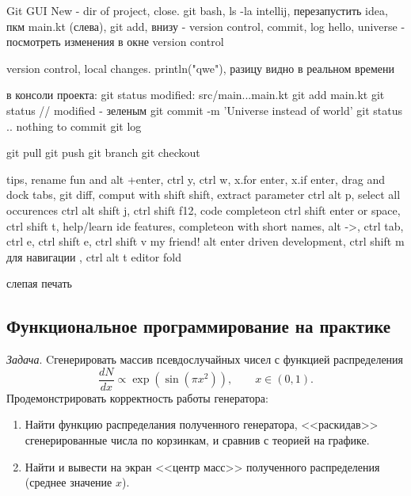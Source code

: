 \documentclass{book}
\begin{document}
Git GUI
New - dir of project, close. git bash, ls -la
intellij, перезапустить idea, пкм main.kt (слева), git add, внизу - version control, commit, log
hello, universe - посмотреть изменения в окне version control

version control, local changes.
println("qwe"), разицу видно в реальном времени

в консоли проекта:
git status
modified: src/main...main.kt
git add main.kt
git status // modified - зеленым
git commit -m 'Universe instead of world'
git status .. nothing to commit
git log

git pull
git push
git branch
git checkout

tips, rename fun and alt +enter, ctrl y, ctrl w, x.for enter, x.if enter, drag and dock tabs, git
diff, comput with shift shift, extract parameter ctrl alt p, select all occurences ctrl alt shift
j, ctrl shift f12, code completeon ctrl shift enter or space, ctrl shift t, help/learn ide
features, completeon with short names, alt ->, ctrl tab, ctrl e, ctrl shift e, ctrl shift v my
friend! alt enter driven development, ctrl shift m для навигации {}, ctrl alt t editor fold

слепая печать

\subsection{Функциональное программирование на практике}

\clearpage

\textit{Задача}. Cгенерировать массив псевдослучайных чисел с функцией распределения
\begin{equation}
    \frac{dN}{dx} \propto \exp(\sin(\pi x^2)), \qquad x \in (0, 1).
\end{equation}
Продемонстрировать корректность работы генератора:
\begin{enumerate}
  \item Найти функцию распределания полученного генератора, <<раскидав>> сгенерированные числа по
      корзинкам, и сравнив с теорией на графике.
  \item Найти и вывести на экран <<центр масс>> полученного распределения (среднее значение $x$).
\end{enumerate}
\end{document}
